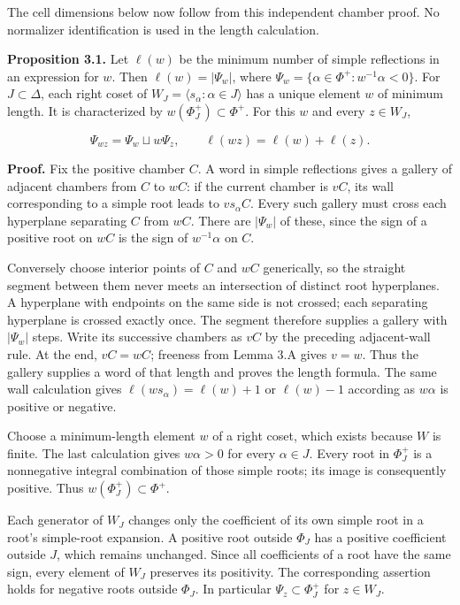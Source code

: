 \documentclass[11pt,a4paper,openany]{report}
\begin{document}
The cell dimensions below now follow from this independent chamber proof. No normalizer identification is used in the length calculation.

\textbf{Proposition 3.1.} Let \(\ell(w)\) be the minimum number of simple reflections in an expression for \(w\). Then \(\ell(w)=|\Psi_w|\), where \(\Psi_w=\{\alpha\in\Phi^+:w^{-1}\alpha<0\}\). For \(J\subset\Delta\), each right coset of \(W_J=\langle s_\alpha:\alpha\in J\rangle\) has a unique element \(w\) of minimum length. It is characterized by \(w(\Phi_J^+)\subset\Phi^+\). For this \(w\) and every \(z\in W_J\),

\[
\Psi_{wz}=\Psi_w\sqcup w\Psi_z,
\qquad \ell(wz)=\ell(w)+\ell(z).
\]

\textbf{Proof.} Fix the positive chamber \(C\). A word in simple reflections gives a gallery of adjacent chambers from \(C\) to \(wC\): if the current chamber is \(vC\), its wall corresponding to a simple root leads to \(vs_\alpha C\). Every such gallery must cross each hyperplane separating \(C\) from \(wC\). There are \(|\Psi_w|\) of these, since the sign of a positive root on \(wC\) is the sign of \(w^{-1}\alpha\) on \(C\).

Conversely choose interior points of \(C\) and \(wC\) generically, so the straight segment between them never meets an intersection of distinct root hyperplanes. A hyperplane with endpoints on the same side is not crossed; each separating hyperplane is crossed exactly once. The segment therefore supplies a gallery with \(|\Psi_w|\) steps. Write its successive chambers as \(vC\) by the preceding adjacent-wall rule. At the end, \(vC=wC\); freeness from Lemma 3.A gives \(v=w\). Thus the gallery supplies a word of that length and proves the length formula. The same wall calculation gives \(\ell(ws_\alpha)=\ell(w)+1\) or \(\ell(w)-1\) according as \(w\alpha\) is positive or negative.

Choose a minimum-length element \(w\) of a right coset, which exists because \(W\) is finite. The last calculation gives \(w\alpha>0\) for every \(\alpha\in J\). Every root in \(\Phi_J^+\) is a nonnegative integral combination of those simple roots; its image is consequently positive. Thus \(w(\Phi_J^+)\subset\Phi^+\).

Each generator of \(W_J\) changes only the coefficient of its own simple root in a root's simple-root expansion. A positive root outside \(\Phi_J\) has a positive coefficient outside \(J\), which remains unchanged. Since all coefficients of a root have the same sign, every element of \(W_J\) preserves its positivity. The corresponding assertion holds for negative roots outside \(\Phi_J\). In particular \(\Psi_z\subset\Phi_J^+\) for \(z\in W_J\).
\end{document}
